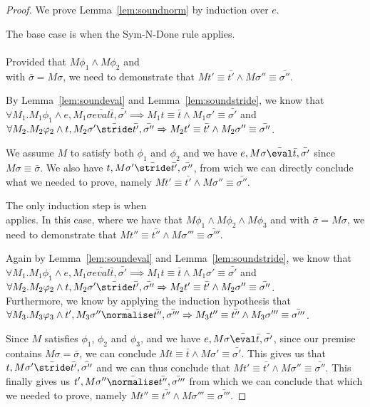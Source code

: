 \begin{proof}
  We prove Lemma~\ref{lem:soundnorm} by induction over $e$.

  The base case is when the Sym-N-Done rule applies.\\
  \\

  Provided that $M\phi_1\land M\phi_2$ and\\
   with $\bar{\sigma}=M\sigma$,
  we need to demonstrate that $M t'\equiv \bar{t'}\land M\sigma''\equiv \bar{\sigma''}$.

  By Lemma~\ref{lem:soundeval} and Lemma~\ref{lem:soundstride}, we know that\\
  $\forall M_1. M_1\phi_1 \land e,M_1\sigma \bar{eval}\bar{t},\bar{\sigma'}\implies M_1 t \equiv \bar{t} \land M_1 \sigma'\equiv \bar{\sigma'}$ and\\
  $\forall M_2.M_2\phi_2\land t,M_2\sigma'\bar{\stride}\bar{t'},\bar{\sigma''}\implies M_2 t'\equiv\bar{t'}\land M_2\sigma''\equiv \bar{\sigma''}$.

  We assume $M$ to satisfy both $\phi_1$ and $\phi_2$ and we have $e,M\sigma \bar{\eval}\bar{t},\bar{\sigma'}$ since $M\sigma\equiv \bar{\sigma}$.
  We also have $t,M\sigma'\bar{\stride}\bar{t'},\bar{\sigma''}$,
  from wich we can directly conclude what we needed to prove,
  namely $M t'\equiv \bar{t'}\land M\sigma''\equiv \bar{\sigma''}$.

  The only induction step is when\\
   applies.
  In this case, where we have that $M\phi_1\land M\phi_2 \land M\phi_3$ and  with $\bar{\sigma}=M\sigma$,
  we need to demonstrate that $M t''\equiv \bar{t''}\land M\sigma'''\equiv \bar{\sigma'''}$.

  Again by Lemma~\ref{lem:soundeval} and Lemma~\ref{lem:soundstride}, we know that\\
  $\forall M_1. M_1\phi_1 \land e,M_1\sigma \bar{eval}\bar{t},\bar{\sigma'}\implies M_1 t \equiv \bar{t} \land M_1 \sigma'\equiv \bar{\sigma'}$ and\\
  $\forall M_2.M_2\phi_2\land t,M_2\sigma'\bar{\stride}\bar{t'},\bar{\sigma''}\implies M_2 t'\equiv\bar{t'}\land M_2\sigma''\equiv \bar{\sigma''}$.\\
  Furthermore, we know by applying the induction hypothesis that $\forall M_3.M_3\phi_3 \land t',M_3\sigma''\bar{\normalise} \bar{t''},\bar{\sigma'''}\implies M_3 t''\equiv \bar{t''}\land M_3 \sigma'''\equiv \bar{\sigma'''}$.

  Since $M$ satisfies $\phi_1$, $\phi_2$ and $\phi_3$, and we have $e,M\sigma \bar{\eval}\bar{t},\bar{\sigma'}$, since our premise contains $M\sigma = \bar{\sigma}$, we can conclude $M t \equiv \bar{t} \land M \sigma'\equiv \bar{\sigma'}$.
  This gives us that $t,M\sigma'\bar{\stride}\bar{t'},\bar{\sigma''}$ and we can thus conclude that $M t'\equiv\bar{t'}\land M\sigma''\equiv \bar{\sigma''}$.
  This finally gives us $t',M\sigma''\bar{\normalise} \bar{t''},\bar{\sigma'''}$ from which we can conclude that which we needed to prove,
  namely $M t''\equiv \bar{t''}\land M\sigma'''\equiv \bar{\sigma'''}$.
\end{proof}

